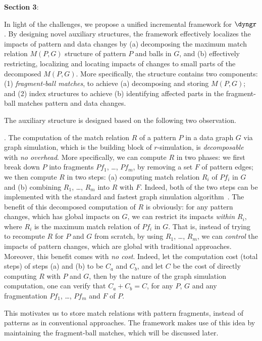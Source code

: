 {\bf Section 3}:

In light of the challenges, we propose a unified incremental framework for $\dyngr$.
By designing novel auxiliary structures, the framework effectively localizes the impacts of pattern and data changes by (a) decomposing the maximum match relation $M(P, G)$ \wrt structure of pattern $P$ and balls in $G$, and (b) effectively restricting, localizing and locating impacts of changes to small parts of the decomposed $M(P,G)$.
More specifically, the structure contains two components: (1) {\em fragment-ball matches}, to achieve (a) decomposing and storing $M(P, G)$; and (2) index structures to achieve (b) identifying affected parts in the fragment-ball matches \wrt pattern and data changes.

The auxiliary structure is designed based on the following two observation.

.
The computation of the match relation $R$ of a pattern $P$ in a data graph $G$ via graph simulation, which is the building block of $r$-simulation, is {\em decomposable} with {\em no overhead}. More specifically, we can compute $R$ in two phases:
we first break down $P$ into fragments $Pf_{1}$, \ldots, $Pf_{m}$, by removing a set $F$ of pattern edges; we then compute $R$ in two steps:
(a) computing match relation $R_{i}$ of $Pf_{i}$ in $G$ and (b) combining $R_{1}$, \ldots, $R_{m}$ into $R$ with $F$.
Indeed, both of the two steps can be implemented with the standard and fastest graph simulation algorithm~\cite{infsimu95}.
The benefit of this decomposed computation of $R$ is obviously: for any pattern changes, which has global impacts on $G$, we can restrict its impacts {\em within $R_{i}$}, where $R_{i}$ is the maximum match relation of $Pf_{i}$ in $G$. That is, instead of trying to recompute $R$ for $P$ and $G$ from scratch, by using $R_{1}$, \ldots, $R_{m}$, we can {\em control} the impacts of pattern changes, which are global with traditional approaches.
Moreover, this benefit comes with {\em no cost}. Indeed, let the computation cost (total steps) of steps (a) and (b) to be $C_{a}$ and $C_{b}$, and let $C$ be the cost of directly computing $R$ with $P$ and $G$, then by the nature of the graph simulation computation, one can verify that $C_{a} + C_{b} = C$, for any $P$, $G$ and any fragmentation $Pf_{1}$, \ldots, $Pf_{m}$ and $F$ of $P$.

This motivates us to store match relations with pattern fragments, instead of patterns as in conventional approaches. The framework makes use of this idea by maintaining the fragment-ball matches, which will be discussed later.

